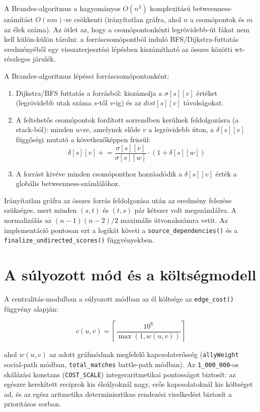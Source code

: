 ﻿\documentclass[a4paper,12pt]{report}
\begin{document}
A Brandes-algoritmus \cite{brandes2001} a hagyományos $O(n^3)$ komplexitású betweenness-számítást $O(nm)$-re csökkenti (irányítatlan gráfra, ahol $n$ a csomópontok és $m$ az élek száma). Az ötlet az, hogy a csomópontonkénti legrövidebb-út fákat nem kell külön-külön tárolni: a forráscsomópontból induló BFS/Dijkstra-futtatás eredményéből egy visszaterjesztési lépésben kiszámítható az összes közötti wt-részleges járulék.

A Brandes-algoritmus lépései forráscsomópontonként:

\begin{enumerate}
    \item Dijkstra/BFS futtatás a forrásból: kiszámolja a $\sigma[s][v]$ értéket (legrövidebb utak száma $s$-től $v$-ig) és az $dist[s][v]$ távolságokat.
    \item A feltehetős csomópontok fordított sorrendben kerülnek feldolgozásra (a stack-ból): minden $w$-re, amelynek előde $v$ a legrövidebb úton, a $\delta[s][v]$ függőségi mutató a következőképpen frissül:
    \begin{equation}
    \delta[s][v] \mathrel{+}= \frac{\sigma[s][v]}{\sigma[s][w]} \cdot (1 + \delta[s][w])
    \end{equation}
    \item A forrást kivéve minden csomóponthoz hozzáadódik a $\delta[s][v]$ érték a globális betweenness-számlálóhoz.
\end{enumerate}

Irányítatlan gráfra az összes forrás feldolgozása után az eredmény felezése szükséges, mert minden $(s, t)$ és $(t, s)$ pár kétszer volt megszámlálva. A normalizálás az $(n-1)(n-2)/2$ maximális útvonalszámra vetít. Az implementáció pontosan ezt a logikát követi a \texttt{source\_dependencies()} és a \texttt{finalize\_undirected\_scores()} függvényekben.

\section{A súlyozott mód és a költségmodell}

A centralitás-modulban a súlyozott módban az él költsége az \texttt{edge\_cost()} függvény alapján:

\begin{equation}
c(u,v) = \left\lceil \frac{10^6}{\max(1, w(u,v))} \right\rceil
\end{equation}

ahol $w(u,v)$ az adott gráfmódnak megfelelő kapcsolaterősség (\texttt{allyWeight} social-path módban, \texttt{total\_matches} battle-path módban). Az \texttt{1\_000\_000}-os skálázási konstans (\texttt{COST\_SCALE}) integeraritmetikai pontosságot biztosít: az egészre kerekített reciprok kis élsúlyoknál nagy, erős kapcsolatoknál kis költséget ad, és az egész aritmetika determinisztikus rendezési viselkedést biztosít a prioritásos sorban.
\end{document}
